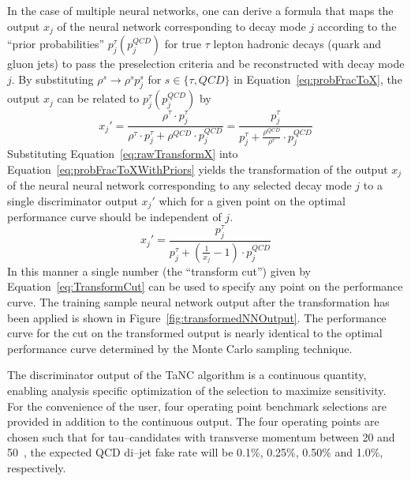 In the case of multiple neural networks, one can derive a formula that maps the
output $x_j$ of the neural network corresponding to decay mode $j$ according to
the ``prior probabilities'' $p_j^\tau (p_j^{QCD})$ for true $\tau$ lepton
hadronic decays (quark and gluon jets) to pass the preselection criteria and
be reconstructed with decay mode $j$.
By substituting $\rho^s \rightarrow \rho^s p_j^s$ for $s \in \{\tau, QCD\}$ in
Equation~\ref{eq:probFracToX}, the output $x_j$ can be related to $p_j^\tau
(p_j^{QCD})$ by 
\begin{equation}
   x_j' = \frac{\rho^\tau \cdot p_j^\tau} 
   {\rho^\tau \cdot p_j^\tau + \rho^{QCD} \cdot p_j^{QCD} }
   = \frac{p_j^\tau} 
   {p_j^\tau + \frac{\rho^{QCD}}{\rho^\tau} \cdot p_j^{QCD} }
   \label{eq:probFracToXWithPriors}
\end{equation}
Substituting Equation~\ref{eq:rawTransformX} into
Equation~\ref{eq:probFracToXWithPriors} yields the transformation of the output
$x_j$ of the neural neural network corresponding to any selected decay mode $j$
to a single discriminator output $x_j'$ which for a given point on the optimal
performance curve should be independent of $j$.
\begin{equation}
   x_j' = \frac{p_j^\tau} 
   {p_j^\tau + \left(\frac{1}{x_j}-1\right)\cdot p_j^{QCD} }
   \label{eq:TransformCut}
\end{equation}
In this manner a single number (the ``transform cut'') given by
Equation~\ref{eq:TransformCut} can be used to specify any point on the
performance curve.  The training sample neural network output after the
transformation has been applied is shown in
Figure~\ref{fig:transformedNNOutput}.  The performance curve for the cut on the
transformed output is nearly identical to the optimal performance curve
determined by the Monte Carlo sampling technique. 

The discriminator output of the TaNC algorithm is a continuous quantity,
enabling analysis specific optimization of the selection to maximize
sensitivity.  For the convenience of the user, four operating point benchmark
selections are provided in addition to the continuous output. The four operating
points are chosen such that for tau--candidates with transverse momentum between
20 and 50~\GeVc, the expected QCD di--jet fake rate will be 0.1\%, 0.25\%,
0.50\% and 1.0\%, respectively.  

